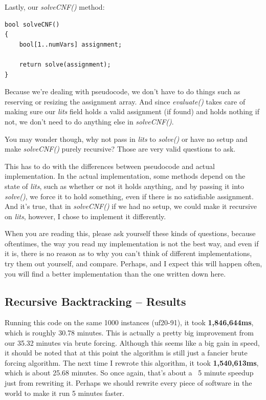 \documentclass[oneside]{book}
\begin{document}
Lastly, our \textit{solveCNF()} method:

\begin{lstlisting}
bool solveCNF()
{
    bool[1..numVars] assignment;

    return solve(assignment);
}
\end{lstlisting}

Because we're dealing with pseudocode, we don't have to do things such as
reserving or resizing the assignment array. And since \textit{evaluate()} takes
care of making sure our \textit{lits} field holds a valid assignment (if found)
and holds nothing if not, we don't need to do anything else in
\textit{solveCNF()}.

You may wonder though, why not pass in \textit{lits} to \textit{solve()} or
have no setup and make \textit{solveCNF()} purely recursive?
Those are very valid questions to ask.

This has to do with the differences between pseudocode and actual
implementation. In the actual implementation, some methods depend on the
state of \textit{lits}, such as whether or not it holds anything, and by passing
it into \textit{solve()}, we force it to hold something, even if there is no
satisfiable assignment. And it's true, that in \textit{solveCNF()} if we had no
setup, we could make it recursive on \textit{lits}, however, I chose to
implement it differently.

When you are reading this, please ask yourself these kinds of questions,
because oftentimes, the way you read my implementation is not the best way,
and even if it is, there is no reason as to why you can't think of different
implementations, try them out yourself, and compare. Perhaps, and I expect
this will happen often, you will find a better implementation than the one
written down here.

\subsection{Recursive Backtracking -- Results}

Running this code on the same 1000 instances (uf20-91), it took
\textbf{1,846,644ms}, which is roughly 30.78 minutes. This is actually a pretty big
improvement from our 35.32 minutes via brute forcing. Although this seems
like a big gain in speed, it should be noted that at this point the algorithm is
still just a fancier brute forcing algorithm. The next time I rewrote this algorithm,
it took \textbf{1,540,613ms}, which is about 25.68 minutes. So once again, that's about a 
~5 minute speedup just from rewriting it. Perhaps we should rewrite every piece of 
software in the world to make it run 5 minutes faster. 
\end{document}
